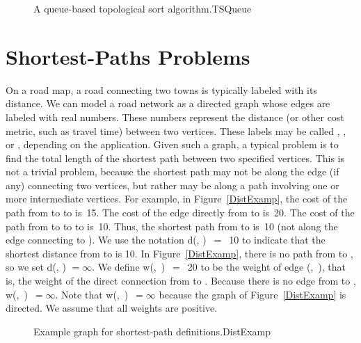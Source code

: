 \begin{figure}
\vspace{-\bigskipamount}
{A queue-based topological sort algorithm.}{TSQueue}
\end{figure}


\section{Shortest-Paths Problems}
\label{ShortPath}

On a road map, a road connecting two towns is typically
labeled with its distance.
We can model a road network as a
directed graph whose edges are
labeled with real numbers.
These numbers represent the distance (or other cost metric, such as
travel time) between two vertices.
These labels may be called , , or
, depending on the application.
Given such a graph, a typical problem is to find the total
length of the shortest path between two specified vertices.
This is not a trivial problem, because the shortest path may not be
along the edge (if any) connecting two vertices, but rather may be
along a path involving one or more intermediate vertices.
For example, in Figure~\ref{DistExamp}, the cost of the path from
 to  to  is~15.
The cost of the edge directly from  to  is~20.
The cost of the path from  to  to  to 
is~10.
Thus, the shortest path from  to  is~10 (not along
the edge connecting  to ).
We use the notation d(, )~\(=\)~10 to indicate that the
shortest distance from  to  is 10.
In Figure~\ref{DistExamp}, there is no path from  to ,
so we set d(, ) \(= \infty\).
We define w(,~)~\(=\)~20 to be the weight of edge
(,~), that is, the weight of the direct connection
from  to . 
Because there is no edge from  to ,
w(,~)~\(= \infty\).
Note that w(,~)~\(= \infty\) because the graph of
Figure~\ref{DistExamp} is directed.
We assume that all weights are positive.

\begin{figure}
\vspace{-\bigskipamount}\vspace{-\bigskipamount}
{Example graph for shortest-path definitions.}{DistExamp}
\smallskip
{}
\end{figure}

